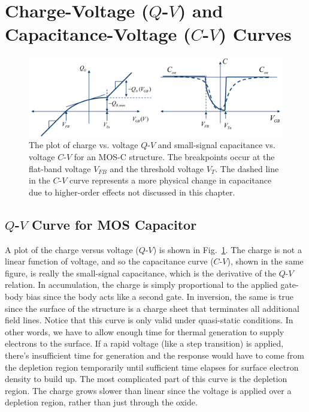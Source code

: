 \section{Charge-Voltage (\texorpdfstring{$Q$-$V$}{Q-V}) and Capacitance-Voltage (\texorpdfstring{$C$-$V$}{C-V}) Curves}
\begin{figure}[tbh]
\centering
\includegraphics[width=\columnwidth]{mos_qv_cv}
\caption{The plot of charge vs. voltage $Q$-$V$ and small-signal capacitance vs. voltage $C$-$V$ for an MOS-C structure.  The breakpoints occur at the flat-band voltage $V_{FB}$ and the threshold voltage $V_T$.  The dashed line in the $C$-$V$ curve represents a more physical change in capacitance due to higher-order effects not discussed in this chapter.}
\label{fig:mos_qv_cv}
\end{figure}
\subsection{\texorpdfstring{$Q$-$V$}{Q-V} Curve for MOS Capacitor}
A plot of the charge versus voltage ($Q$-$V$) is shown in Fig.~\ref{fig:mos_qv_cv}.  The charge is not a linear function of voltage, and so the capacitance curve ($C$-$V$), shown in the same figure, is really the small-signal capacitance, which is the derivative of the $Q$-$V$ relation.   In accumulation, the charge is simply proportional to the applied gate-body bias since the body acts like a second gate.  In inversion, the same is true since the surface of the structure is a charge sheet that terminates all additional field lines.  Notice that this curve is only valid under quasi-static conditions.  In other words, we have to allow enough time for thermal generation to supply electrons to the surface.  If a rapid voltage (like a step transition) is applied, there's insufficient time for generation and the response would have to come from the depletion region temporarily until sufficient time elapses for surface electron density to build up.  
The most complicated part of this curve is the depletion region.  The charge grows slower than linear since the voltage is applied over a depletion region, rather than just through the oxide.  
